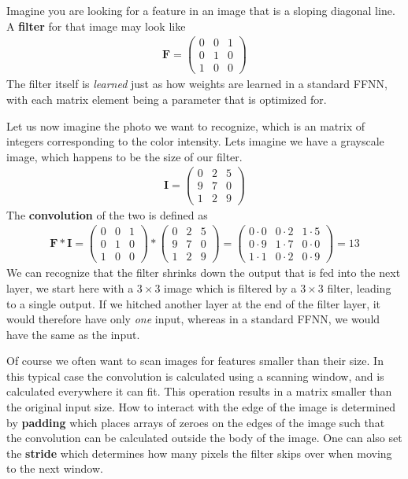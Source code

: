 Imagine you are looking for a feature in an image that is a sloping diagonal line. A \textbf{filter} for that image may look like
\begin{align}
    \textbf{F} = 
\begin{pmatrix}
0 & 0 & 1 \\
0 & 1 & 0 \\
1 & 0 & 0
\end{pmatrix}
\end{align}
The filter itself is \emph{learned} just as how weights are learned in a standard FFNN, with each matrix element being a parameter that is optimized for.

Let us now imagine the photo we want to recognize, which is an matrix of integers corresponding to the color intensity. Lets imagine we have a grayscale image, which happens to be the size of our filter.
\begin{align}
    \textbf{I} = 
\begin{pmatrix}
0 & 2 & 5 \\
9 & 7 & 0 \\
1 & 2 & 9
\end{pmatrix}
\end{align}
The \textbf{convolution} of the two is defined as
\begin{align}
\textbf{F} * \textbf{I} = 
\begin{pmatrix}
0 & 0 & 1 \\
0 & 1 & 0 \\
1 & 0 & 0
\end{pmatrix}
*
    \begin{pmatrix}
0 & 2 & 5 \\
9 & 7 & 0 \\
1 & 2 & 9
\end{pmatrix}
=     
\begin{pmatrix}
0\cdot 0 & 0\cdot2 & 1\cdot 5 \\
0\cdot 9 & 1\cdot 7 & 0\cdot 0 \\
1\cdot 1 & 0\cdot 2 & 0 \cdot 9
\end{pmatrix} = 13
\end{align}
We can recognize that the filter shrinks down the output that is fed into the next layer, we start here with a $3\times 3$ image which is filtered by a $3\times 3$ filter, leading to a single output. If we hitched another layer at the end of the filter layer, it would therefore have only \emph{one} input, whereas in a standard FFNN, we would have the same as the input.

Of course we often want to scan images for features smaller than their size. In this typical case the convolution is calculated using a scanning window, and is calculated everywhere it can fit. This operation results in a matrix smaller than the original input size. How to interact with the edge of the image is determined by \textbf{padding} which places arrays of zeroes on the edges of the image such that the convolution can be calculated outside the body of the image. One can also set the \textbf{stride} which determines how many pixels the filter skips over when moving to the next window.

